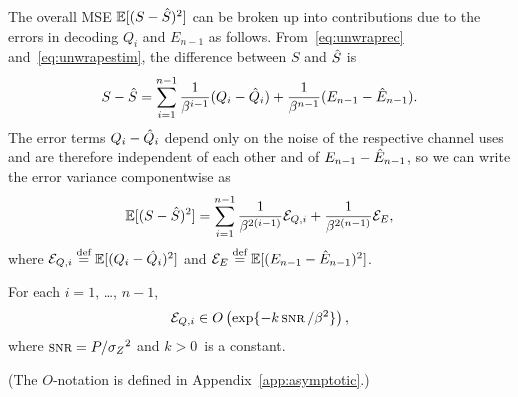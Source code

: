 The overall MSE $\mathbb{E}[(S-{\hat{S}})^2]$ can be broken up into contributions due to the
errors in decoding $Q_i$ and $E_{n-1}$ as follows. From~\eqref{eq:unwraprec}
and~\eqref{eq:unwrapestim}, the difference between $S$ and ${\hat{S}}$ is
\begin{equation*}
  S - {\hat{S}} = \sum_{i=1}^{n-1} \frac1{\beta^{i-1}} (Q_i - \hat{Q}_i) + \frac1{\beta^{n-1}}
  (E_{n-1} - \hat{E}_{n-1}).
\end{equation*}
The error terms $Q_i - \hat{Q}_i$ depend only on the noise of the respective channel
uses and are therefore independent of each other and of $E_{n-1} - \hat{E}_{n-1}$,
so we can write the error variance componentwise as
\begin{equation}
  \label{eq:totalerror}
  \mathbb{E}[(S-{\hat{S}})^2] = \sum_{i=1}^{n-1} \frac{1}{\beta^{2(i-1)}} {{\mathcal{E}}_{Q,i}} +
  \frac{1}{\beta^{2(n-1)}} {{\mathcal{E}}_E}, 
\end{equation}
where ${{\mathcal{E}}_{Q,i}} \stackrel{\text{def}}{=} \mathbb{E}[(Q_i - \hat{Q}_i)^2]$ and ${{\mathcal{E}}_E} \stackrel{\text{def}}{=} \mathbb{E}[(E_{n-1} -
\hat{E}_{n-1})^2]$.

\begin{lemma}
  \label{lem:eqbound}
  For each $i = 1$, \dots, $n-1$, 
  \begin{equation}
    \label{eq:eqidecay}
    \Eqi \in O\left(\exp\{-k \snr/\beta^2\}\right),
  \end{equation}
  where $\snr = P/\szq$ and $k > 0$~is a constant.
\end{lemma}
(The $O$-notation is defined in Appendix~\ref{app:asymptotic}.)

